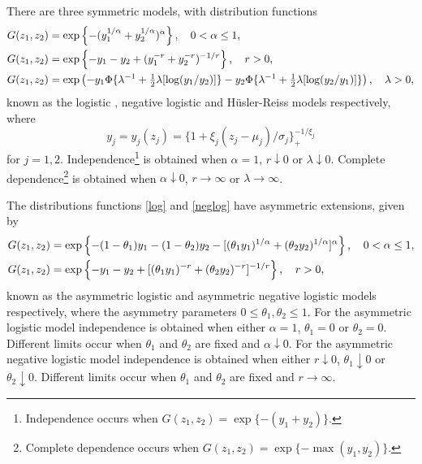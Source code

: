 \documentclass[11pt,a4paper]{article}
\begin{document}
There are three symmetric models, with distribution functions 
\begin{align}
&G(z_1,z_2) = \exp\left\{- (y_1^{1/\alpha}+y_2^{1/\alpha})^\alpha \right\}, \quad 0<\alpha\leq1, \label{log} \\
&G(z_1,z_2) = \exp\left\{ - y_1 - y_2 + (y_1^{-r}+y_2^{-r})^{-1/r} \right\}, \quad r>0, \label{neglog} \\
&G(z_1,z_2) = \exp\left( - y_1\Phi\{\lambda^{-1}+{\textstyle\frac{1}{2}}\lambda[\log(y_1/y_2)]\} - y_2\Phi\{\lambda^{-1}+{\textstyle\frac{1}{2}}\lambda[\log(y_2/y_1)]\}\right), \quad \lambda>0, \notag
\end{align}
known as the logistic \citep{gumb60b}, negative logistic \citep{gala75} and H\"{u}sler-Reiss \citep{huslreis89} models respectively, where
\begin{equation}
y_j = y_j(z_j) = \{1+\xi_j(z_j-\mu_j)/\sigma_j\}_{+}^{-1/\xi_j}
\label{mtrans}
\end{equation}
for $j=1,2$.
Independence\footnote{
Independence occurs when $G(z_1,z_2) = \exp\{-(y_1+y_2)\}$.} 
is obtained when $\alpha=1$, $r\downarrow0$ or $\lambda\downarrow0$.
Complete dependence\footnote{
Complete dependence occurs when $G(z_1,z_2) = \exp\{-\max(y_1,y_2)\}$.} 
is obtained when $\alpha\downarrow0$, $r\rightarrow\infty$ or $\lambda\rightarrow\infty$.

The distributions functions \eqref{log} and \eqref{neglog} have asymmetric extensions, given by
\begin{align}
&G(z_1,z_2) = \exp\left\{ - (1-\theta_1)y_1 - (1-\theta_2)y_2 - [(\theta_1y_1)^{1/\alpha}+(\theta_2y_2)^{1/\alpha}]^\alpha\right\}, \quad 0<\alpha\leq1, \label{alog} \\
&G(z_1,z_2) = \exp\left\{ - y_1 - y_2 + [(\theta_1y_1)^{-r}+(\theta_2y_2)^{-r}]^{-1/r}\right\}, \quad r>0, \notag 
\end{align}
known as the asymmetric logistic \citep{tawn88} and asymmetric negative logistic \citep{joe90} models respectively, where the asymmetry parameters $0\leq\theta_1,\theta_2\leq1$.
For the asymmetric logistic model independence is obtained when either $\alpha = 1$, $\theta_1 = 0$ or $\theta_2 = 0$.
Different limits occur when $\theta_1$ and $\theta_2$ are fixed and $\alpha\downarrow0$.
For the asymmetric negative logistic model independence is obtained when either $r\downarrow0$, $\theta_1\downarrow0$ or $\theta_2\downarrow0$. 
Different limits occur when $\theta_1$ and $\theta_2$ are fixed and $r\rightarrow\infty$.

\end{document}
